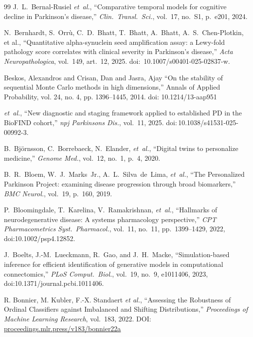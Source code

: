 \begin{thebibliography}{99}
J.~L.~Bernal-Rusiel \textit{et~al.}, ``Comparative temporal models for cognitive decline in Parkinson's disease,'' \textit{Clin.\ Transl.\ Sci.}, vol.~17, no.~S1, p.~e201, 2024.

N.~Bernhardt, S.~Orrù, C.~D.~Bhatt, T.~Bhatt, A.~Bhatt, A.~S.~Chen-Plotkin, et al., ``Quantitative alpha-synuclein seed amplification assay: a Lewy-fold pathology score correlates with clinical severity in Parkinson's disease,'' \textit{Acta Neuropathologica}, vol.~149, art.~12, 2025. doi:~10.1007/s00401-025-02837-w.

 Beskos, Alexandros and Crisan, Dan and Jasra, Ajay ``On the stability of sequential Monte Carlo methods in high dimensions,'' Annals of Applied Probability, vol. 24, no. 4, pp. 1396--1445, 2014. doi: 10.1214/13-aap951

\textit{et~al.}, ``New diagnostic and staging framework applied to established PD in the BioFIND cohort,'' \textit{npj Parkinsons Dis.}, vol.~11, 2025. doi:\,10.1038/s41531-025-00992-3.

B.~Bj{\"o}rnsson, C.~Borrebaeck, N.~Elander, \textit{et~al.}, ``Digital twins to personalize medicine,'' \textit{Genome Med.}, vol.~12, no.~1, p.~4, 2020.

B.~R.~Bloem, W.~J.~Marks~Jr., A.~L.~Silva~de~Lima, \textit{et~al.}, ``The Personalized Parkinson Project: examining disease progression through broad biomarkers,'' \textit{BMC Neurol.}, vol.~19, p.~160, 2019.

P.~Bloomingdale, T.~Karelina, V.~Ramakrishnan, \textit{et~al.}, ``Hallmarks of neurodegenerative disease: A systems pharmacology perspective,'' \textit{CPT Pharmacometrics Syst.\ Pharmacol.}, vol.~11, no.~11, pp.~1399--1429, 2022, doi:10.1002/psp4.12852.

J.~Boelts, J.-M.~Lueckmann, R.~Gao, and J.~H.~Macke, ``Simulation-based inference for efficient identification of generative models in computational connectomics,'' \textit{PLoS Comput.\ Biol.}, vol.~19, no.~9, e1011406, 2023, doi:10.1371/journal.pcbi.1011406.

R. Bonnier, M. Kubler, F.-X. Standaert \textit{et al.},
``Assessing the Robustness of Ordinal Classifiers against Imbalanced and Shifting Distributions,''
\textit{Proceedings of Machine Learning Research}, vol.~183, 2022. DOI: \href{https://proceedings.mlr.press/v183/bonnier22a.html}{proceedings.mlr.press/v183/bonnier22a}


\end{thebibliography}
